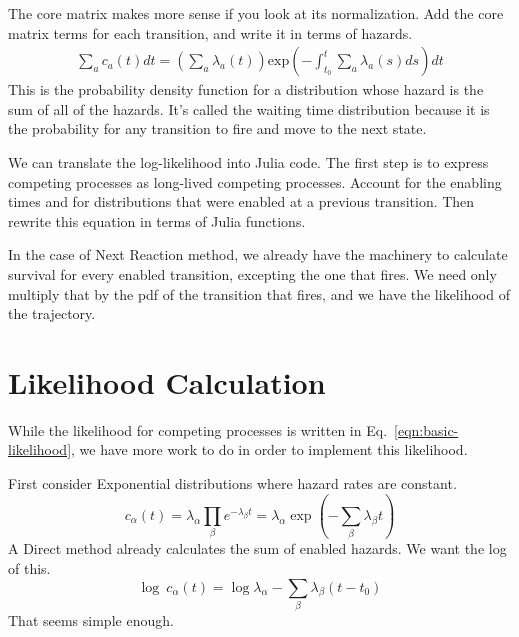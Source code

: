 \documentclass{article}
\begin{document}
The core matrix makes more sense if you look at its normalization. Add the core matrix terms for each transition, and write it in terms of hazards.
\begin{eqnarray}
	\sum_a c_a(t)dt = \left(\sum_a \lambda_a(t)\right)\mbox{exp}\left(-\int_{t_0}^t\sum_a \lambda_a(s)ds \right)dt
\end{eqnarray}
This is the probability density function for a distribution whose hazard is the sum of all of the hazards. It's called the waiting time distribution because it is the probability for any transition to fire and move to the next state.

We can translate the log-likelihood into Julia code. The first step is to express competing processes as long-lived competing processes. Account for the enabling times and for distributions that were enabled at a previous transition. Then rewrite this equation in terms of Julia functions.

In the case of Next Reaction method, we already have the machinery to calculate survival for every enabled transition, excepting the one that fires. We need only multiply that by the pdf of the transition that fires, and we have the likelihood of the trajectory.

\section{Likelihood Calculation}

While the likelihood for competing processes is written in Eq.~\ref{eqn:basic-likelihood}, we have more work to do in order to implement this likelihood.

First consider Exponential distributions where hazard rates are constant.
\begin{equation}
  c_{\alpha}(t)=\lambda_{\alpha}\prod_{\beta}e^{-\lambda_{\beta}t}=\lambda_{\alpha}\exp\left(-\sum_\beta \lambda_\beta t\right)
\end{equation}
A Direct method already calculates the sum of enabled hazards. We want the log of this.
\begin{equation}
  \log\:c_{\alpha}(t)=\log\lambda_{\alpha} - \sum_{\beta}\lambda_{\beta}(t-t_0)
\end{equation}
That seems simple enough.
\end{document}
